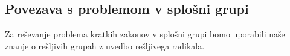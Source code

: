     

\subsection{Povezava s problemom v splošni grupi}

Za reševanje problema kratkih zakonov v splošni grupi bomo uporabili naše znanje o rešljivih grupah z uvedbo rešljivega radikala.

